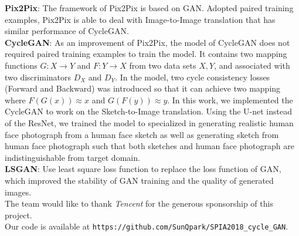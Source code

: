 \textbf{Pix2Pix}: The framework of Pix2Pix is based on GAN. Adopted paired training examples, Pix2Pix is able to deal with Image-to-Image translation that has similar performance of CycleGAN. \\

\textbf{CycleGAN}: As an improvement of Pix2Pix, the model of CycleGAN does not required paired training examples to train the model. It contains two mapping functions $G:X\rightarrow Y$ and $F:Y\rightarrow X$ from two data sets $X,Y$, and associated with two discriminators $D_{X}$ and $D_{Y}$. In the model, two cycle consistency losses (Forward and Backward) was introduced so that it can achieve two mapping where $F(G(x))\approx x$ and $G(F(y))\approx y$\cite{CycleGAN}. In this work, we implemented the CycleGAN to work on the Sketch-to-Image translation. Using the U-net instead of the ResNet, we trained the model to specialized in generating realistic human face photograph from a human face sketch as well as generating sketch from human face photograph such that both sketches and human face photograph are indistinguishable from target domain.\\

\textbf{LSGAN}: Use least square loss function to replace the loss function of GAN, which improved the stability of GAN training and the quality of generated images.\\

The team would like to thank \emph{Tencent} for the generous sponsorship of this project. \\




Our code is available at \texttt{https://github.com/SunQpark/SPIA2018\_cycle\_GAN}.




\endinput




